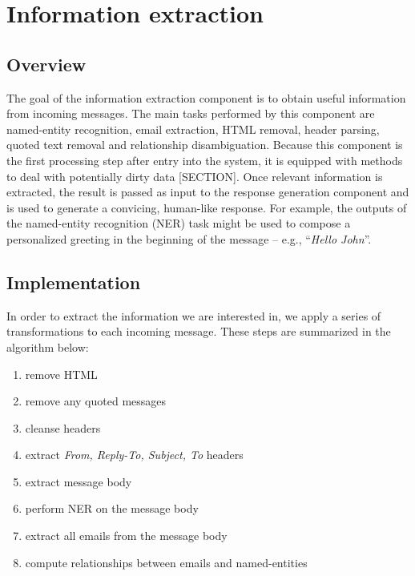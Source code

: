 \chapter{Information extraction}

\section{Overview}
The goal of the information extraction component is to obtain useful information from incoming messages. The main tasks performed by this component are named-entity recognition, email extraction, HTML removal, header parsing, quoted text removal and relationship disambiguation. Because this component is the first processing step after entry into the system, it is equipped with methods to deal with potentially dirty data [SECTION]. Once relevant information is extracted, the result is passed as input to the response generation component and is used to generate a convicing, human-like response. For example, the outputs of the named-entity recognition (NER) task might be used to compose a personalized greeting in the beginning of the message -- e.g., ``\textit{Hello John}''.

\section{Implementation}

In order to extract the information we are interested in, we apply a series of transformations to each incoming message. These steps are summarized in the algorithm below:
\begin{enumerate}
\item remove HTML %
\vspace{-5mm}
\item remove any quoted messages %
\vspace{-5mm}
\item cleanse headers %
\vspace{-5mm}
\item extract \textit{From, Reply-To, Subject, To} headers %
\vspace{-5mm}
\item extract message body %
\vspace{-5mm}
\item perform NER on the message body %
\vspace{-5mm}
\item extract all emails from the message body %
\vspace{-5mm}
\item compute relationships between emails and named-entities %
\end{enumerate}

